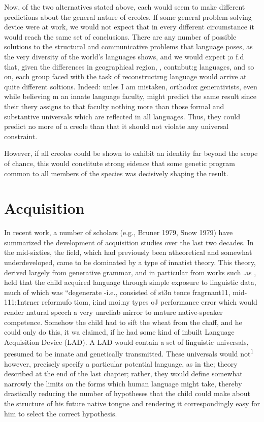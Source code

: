 Now, of the two alternatives stated above, each would seem to make different predictions about the general nature of creoles. If some general problem-solving device were at work, we would not expect that in every different circumstance it would reach the same set of conclusions. There are any number of possible solutions to the struc\-tural and communicative problems that language poses, as the very diversity of the world's languages shows, and we would expect ;o f.{\textquotedbl}d that, given the differences in geographical region, , contnbut:{\textquotedbl}g languages, and so on, each group faced with the task of reconstructrng language would arrive at quite different soltions. Indeed: unles I am mistaken, orthodox generativists, even while believing m an innate language faculty, might predict the same result since their thery assigns to that faculty nothing more than those formal and substantive universals which are reflected in all languages. Thus, they could pre\-dict no more of a creole than that it should not violate any universal constraint.

However, if all creoles could be shown to exhibit an identity far beyond the scope of chance, this would constitute strong eidence that some genetic program common to all members of the species was decisively shaping the result.




\chapter{Acquisition}

In recent work, a number of scholars (e.g., Bruner 1979, Snow 1979) have summarized the development of acquisition studies over the last two decades. In the mid-sixties, the field, which had previously been atheoretical and somewhat underdeveloped, came to be domi\-nated by a type of innatist theory. This theory, derived largely from generative grammar, and in particular from works such .as \citet{Chomsky1962}, held that the child acquired language through simple exposure to linguistic data, much of which was ``degenerate {}-i.e., consisted of st3n tence fragrnant11, mid-111;1ntrncr reformufo tiom, i:ind moi.ny types oJ performance error which would render natural speech a very unreliab mirror to mature native-speaker competence. Somehow the child had to sift the wheat from the chaff, and he could only do this, it wa claimed, if he had some kind of inbuilt Language Acquisition Device (LAD). A LAD would contain a set of linguistic universals, presumed to be innate and genetically transmitted. These universals would not\textsuperscript{1} however, precisely specify a particular potential language, as in the; theory described at the end of the last chapter; rather, they would de\-fine somewhat narrowly the limits on the forms which human language might take, thereby drastically reducing the number of hypotheses
that the child could make about the structure of his future native tongue and rendering it correspondingly easy for him to select the correct hypothesis.

